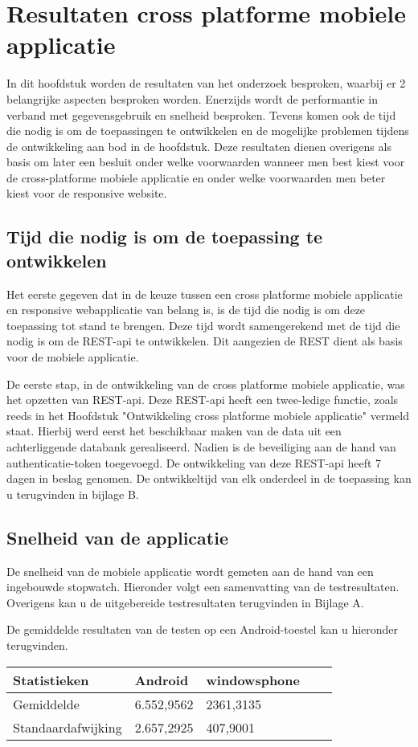 \chapter{Resultaten cross platforme mobiele applicatie}
\label{ch:resultatencrossplatformapp}
In dit hoofdstuk worden de resultaten van het onderzoek besproken, waarbij er 2 belangrijke
aspecten besproken worden.
Enerzijds wordt de performantie in verband met gegevensgebruik en  snelheid besproken.
Tevens komen ook de tijd die nodig is om de toepassingen te ontwikkelen en de mogelijke
problemen tijdens de ontwikkeling aan bod in de hoofdstuk.
Deze resultaten dienen overigens als basis om later een besluit onder welke
voorwaarden wanneer men best kiest voor de
cross-platforme mobiele applicatie en onder welke voorwaarden men beter kiest voor de responsive website.

\section{Tijd die nodig is om de toepassing te ontwikkelen}
Het eerste gegeven dat in de keuze tussen een cross platforme mobiele
applicatie en responsive webapplicatie van belang is,
is de tijd die nodig is om deze toepassing tot stand te brengen.
Deze tijd wordt samengerekend met de tijd die nodig is om de
REST-api te ontwikkelen. Dit aangezien de REST dient als basis voor de mobiele applicatie.

De eerste stap, in de ontwikkeling van de cross platforme mobiele applicatie, was het opzetten van REST-api.
Deze REST-api heeft een twee-ledige functie, zoals reeds in het Hoofdstuk "Ontwikkeling cross platforme mobiele applicatie" vermeld staat.
Hierbij werd eerst het beschikbaar maken van de data uit een achterliggende databank gerealiseerd. Nadien is de beveiliging aan de hand
van authenticatie-token toegevoegd. De ontwikkeling van deze REST-api heeft 7 dagen in beslag genomen. De ontwikkeltijd van elk onderdeel
in de toepassing kan u terugvinden in bijlage B.

\section{Snelheid van de applicatie}
De snelheid van de mobiele applicatie wordt gemeten aan de hand van een ingebouwde stopwatch.
Hieronder volgt een samenvatting van de testresultaten. Overigens kan u de uitgebereide testresultaten terugvinden in Bijlage A.

De gemiddelde resultaten van de testen op een Android-toestel kan u hieronder terugvinden.
\begin{center}
\begin{tabular}{| l | l | l | | l | l }
  \hline
  Statistieken & Android & windowsphone \\ \hline
  Gemiddelde & 6.552,9562 & 2361,3135 \\ \hline
  Standaardafwijking & 2.657,2925 & 407,9001 \\
  \hline
\end{tabular}
\end{center}

